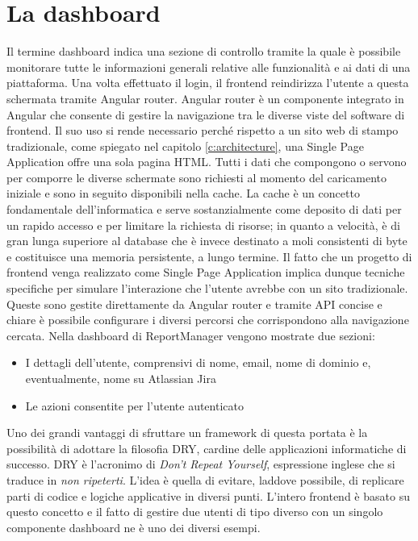 \section{La dashboard}

Il termine dashboard indica una sezione di controllo tramite la quale è possibile monitorare tutte le informazioni generali relative alle funzionalità e ai dati
di una piattaforma.
Una volta effettuato il login, il frontend reindirizza l'utente a questa schermata tramite Angular router.
Angular router è un componente integrato in Angular che consente di gestire la navigazione tra le diverse viste del software di frontend.
Il suo uso si rende necessario perché rispetto a un sito web di stampo tradizionale, come spiegato nel capitolo \ref{c:architecture}, una Single Page Application offre una sola 
pagina HTML.
Tutti i dati che compongono o servono per comporre le diverse schermate sono richiesti al momento del caricamento iniziale e sono in seguito disponibili nella cache.
La cache è un concetto fondamentale dell'informatica e serve sostanzialmente come deposito di dati per un rapido accesso e per limitare la richiesta di risorse; in quanto a velocità, 
è di gran lunga superiore al database che è invece destinato a moli consistenti di byte e costituisce una memoria persistente, a lungo termine.
Il fatto che un progetto di frontend venga realizzato come Single Page Application implica dunque tecniche specifiche per simulare l'interazione che l'utente avrebbe con un sito
tradizionale. Queste sono gestite direttamente da Angular router e tramite API concise e chiare è possibile configurare i diversi percorsi che corrispondono alla navigazione cercata.
Nella dashboard di ReportManager vengono mostrate due sezioni:
\begin{itemize}
    \item I dettagli dell'utente, comprensivi di nome, email, nome di dominio e, eventualmente, nome su Atlassian Jira
    \item Le azioni consentite per l'utente autenticato
\end{itemize}
Uno dei grandi vantaggi di sfruttare un framework di questa portata è la possibilità di adottare la filosofia DRY, cardine delle applicazioni informatiche di successo.
DRY è l'acronimo di \emph{Don't Repeat Yourself}, espressione inglese che si traduce in \emph{non ripeterti}.
L'idea è quella di evitare, laddove possibile, di replicare parti di codice e logiche applicative in diversi punti.
L'intero frontend è basato su questo concetto e il fatto di gestire due utenti di tipo diverso con un singolo componente dashboard ne è uno dei diversi esempi.

